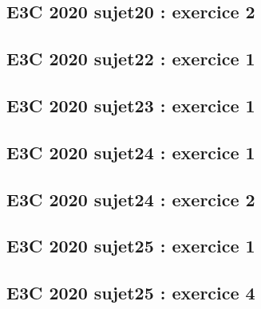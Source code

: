 \documentclass[lang=fr,edition=teacher,layout=sheet]{mxbook}
\begin{document}
\begingroup\endgroup
\par\bigskip
{}\subsection*{E3C 2020 sujet20 : exercice 2}
\begingroup\endgroup
\par\bigskip
{}\subsection*{E3C 2020 sujet22 : exercice 1}
\begingroup\endgroup
\par\bigskip
{}\subsection*{E3C 2020 sujet23 : exercice 1}
\begingroup\endgroup
\par\bigskip
{}\subsection*{E3C 2020 sujet24 : exercice 1}
\begingroup\endgroup
\par\bigskip
{}\subsection*{E3C 2020 sujet24 : exercice 2}
\begingroup\endgroup
\par\bigskip
{}\subsection*{E3C 2020 sujet25 : exercice 1}
\begingroup\endgroup
\par\bigskip
{}\subsection*{E3C 2020 sujet25 : exercice 4}
\begingroup\endgroup
\end{document}
